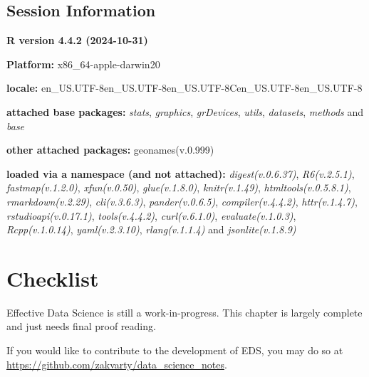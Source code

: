 \documentclass[
  letterpaper,
  DIV=11,
  numbers=noendperiod]{scrreprt}
\begin{document}
\section{Session Information}\label{session-information-5}

\textbf{R version 4.4.2 (2024-10-31)}

\textbf{Platform:} x86\_64-apple-darwin20

\textbf{locale:}
en\_US.UTF-8\textbar\textbar en\_US.UTF-8\textbar\textbar en\_US.UTF-8\textbar\textbar C\textbar\textbar en\_US.UTF-8\textbar\textbar en\_US.UTF-8

\textbf{attached base packages:} \emph{stats}, \emph{graphics},
\emph{grDevices}, \emph{utils}, \emph{datasets}, \emph{methods} and
\emph{base}

\textbf{other attached packages:} geonames(v.0.999)

\textbf{loaded via a namespace (and not attached):}
\emph{digest(v.0.6.37)}, \emph{R6(v.2.5.1)}, \emph{fastmap(v.1.2.0)},
\emph{xfun(v.0.50)}, \emph{glue(v.1.8.0)}, \emph{knitr(v.1.49)},
\emph{htmltools(v.0.5.8.1)}, \emph{rmarkdown(v.2.29)},
\emph{cli(v.3.6.3)}, \emph{pander(v.0.6.5)}, \emph{compiler(v.4.4.2)},
\emph{httr(v.1.4.7)}, \emph{rstudioapi(v.0.17.1)},
\emph{tools(v.4.4.2)}, \emph{curl(v.6.1.0)}, \emph{evaluate(v.1.0.3)},
\emph{Rcpp(v.1.0.14)}, \emph{yaml(v.2.3.10)}, \emph{rlang(v.1.1.4)} and
\emph{jsonlite(v.1.8.9)}

\chapter*{Checklist}\label{data-checklist}


\begin{tcolorbox}[enhanced jigsaw, leftrule=.75mm, bottomtitle=1mm, toprule=.15mm, colbacktitle=quarto-callout-note-color!10!white, breakable, colback=white, bottomrule=.15mm, opacityback=0, colframe=quarto-callout-note-color-frame, title=\textcolor{quarto-callout-note-color}{\faInfo}\hspace{0.5em}{Note}, titlerule=0mm, toptitle=1mm, opacitybacktitle=0.6, arc=.35mm, rightrule=.15mm, coltitle=black, left=2mm]

Effective Data Science is still a work-in-progress. This chapter is
largely complete and just needs final proof reading.

If you would like to contribute to the development of EDS, you may do so
at \url{https://github.com/zakvarty/data_science_notes}.

\end{tcolorbox}
\end{document}
